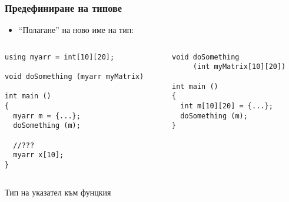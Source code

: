 \documentclass{beamer}
\begin{document}
\begin{frame}[fragile]
\frametitle{Предефиниране на типове}

\begin{itemize}
  \item ``Полагане'' на ново име на тип:
\end{itemize}



\begin{columns}[t]
  \begin{column}{0.5\textwidth}
\begin{flushleft}
\begin{lstlisting}
using myarr = int[10][20];

void doSomething (myarr myMatrix)

int main ()
{
  myarr m = {...};
  doSomething (m);

  //???
  myarr x[10];
}
\end{lstlisting}  
\end{flushleft}


  \end{column}
  \begin{column}{0.5\textwidth}
\begin{flushleft}
\begin{lstlisting}
void doSomething 
     (int myMatrix[10][20])

int main ()
{
  int m[10][20] = {...};
  doSomething (m);
}
\end{lstlisting}  
\end{flushleft}

  \end{column}
\end{columns}


\end{frame}

\begin{frame}
\centerline{Тип на указател към фунцкия}
\end{frame}
\end{document}

